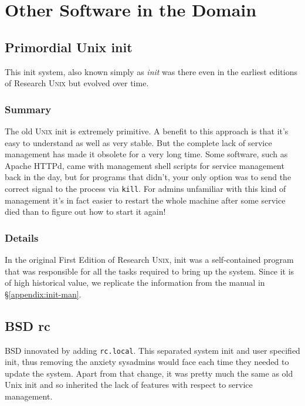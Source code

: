 \documentclass{article}
\begin{document}
\section{Other Software in the Domain}
\subsection{Primordial Unix init}
\nocite{unix-ii}

This init system, also known simply as \textit{init} was there even in the earliest editions of Research U\textsc{nix} but evolved over time.

\subsubsection{Summary}
The old U\textsc{nix} init is extremely primitive. A benefit to this approach is that it's easy to
understand as well as very stable. But the complete lack of service management has made it obsolete for
a very long time. Some software, such as Apache HTTPd, came with management shell
scripts for service management back in the day, but for programs that didn't,
your only option was to send the correct signal to the process via \texttt{kill}. For admins unfamiliar
with this kind of management it's in fact easier to restart the whole machine after some service died
than to figure out how to start it again!

\subsubsection{Details}

In the original First Edition of Research U\textsc{nix}, init was a self-contained program that was
responsible for all the tasks required to bring up the system. Since it is of high historical value, we
replicate the information from the manual in \S\ref{appendix:init-man}. 


\subsection{BSD rc}
BSD innovated by adding \texttt{rc.local}. This separated system init and user specified
init, thus removing the anxiety sysadmins would face each time they needed to update the
system. Apart from that change, it was pretty much the same as old Unix init
and so inherited the lack of features with respect to service management.
\end{document}
